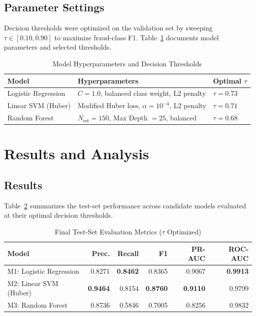 \documentclass[conference]{IEEEtran}
\begin{document}
\subsection{Parameter Settings}
Decision thresholds were optimized on the validation set by sweeping $\tau \in [0.10, 0.90]$ to maximize fraud-class F1. Table~\ref{tab:hyperparams} documents model parameters and selected thresholds.

\begin{table}[htbp]
\caption{Model Hyperparameters and Decision Thresholds}
\label{tab:hyperparams}
\centering
\small
\begin{tabular}{lll}
\toprule
\textbf{Model} & \textbf{Hyperparameters} & \textbf{Optimal $\tau$} \\
\midrule
Logistic Regression & $C=1.0$, balanced class weight, L2 penalty & $\tau = 0.73$ \\
Linear SVM (Huber) & Modified Huber loss, $\alpha = 10^{-4}$, L2 penalty & $\tau = 0.71$ \\
Random Forest & $N_{\text{est}}=150$, Max Depth $=25$, balanced & $\tau = 0.68$ \\
\bottomrule
\end{tabular}
\end{table}

\section{Results and Analysis}

\subsection{Results}
Table~\ref{tab:results} summarizes the test-set performance across candidate models evaluated at their optimal decision thresholds.

\begin{table}[htbp]
\caption{Final Test-Set Evaluation Metrics ($\tau$ Optimized)}
\label{tab:results}
\centering
\small
\begin{tabular}{lrrrrr}
\toprule
\textbf{Model} & \textbf{Prec.} & \textbf{Recall} & \textbf{F1} & \textbf{PR-AUC} & \textbf{ROC-AUC} \\
\midrule
M1: Logistic Regression & 0.8271 & \textbf{0.8462} & 0.8365 & 0.9067 & \textbf{0.9913} \\
M2: Linear SVM (Huber)  & \textbf{0.9464} & 0.8154 & \textbf{0.8760} & \textbf{0.9110} & 0.9799 \\
M3: Random Forest       & 0.8736 & 0.5846 & 0.7005 & 0.8256 & 0.9832 \\
\bottomrule
\end{tabular}
\end{table}
\end{document}
